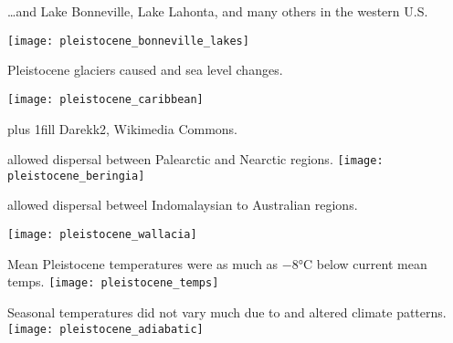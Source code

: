 \documentclass[t]{beamer}
\begin{document}
\begin{frame}{\dots and Lake Bonneville, Lake Lahonta, and many others in the western U.S.}
	\begin{center}
		\texttt{[image: pleistocene\_bonneville\_lakes]}
	\end{center}
\end{frame}

\begin{frame}{Pleistocene glaciers caused  and  sea level changes.}
	\vspace{-\baselineskip}
	\begin{center}
		\texttt{[image: pleistocene\_caribbean]}
	\end{center}
	\vskip0pt plus 1fill
	\hfill\tiny Darekk2, Wikimedia Commons.
\end{frame}

\begin{frame}{ allowed dispersal between Palearctic and Nearctic regions.}
		\texttt{[image: pleistocene\_beringia]}
\end{frame}

\begin{frame}{ allowed dispersal betweel Indomalaysian to Australian regions.}
	\vspace{-\baselineskip}
	\begin{center}
		\texttt{[image: pleistocene\_wallacia]}
	\end{center}
\end{frame}

\begin{frame}{Mean Pleistocene temperatures were as much as $-$8°C below current mean temps.}
	\texttt{[image: pleistocene\_temps]}
\end{frame}

\begin{frame}{Seasonal temperatures did not vary much due to  and altered climate patterns.}
	\texttt{[image: pleistocene\_adiabatic]}
\end{frame}
\end{document}

